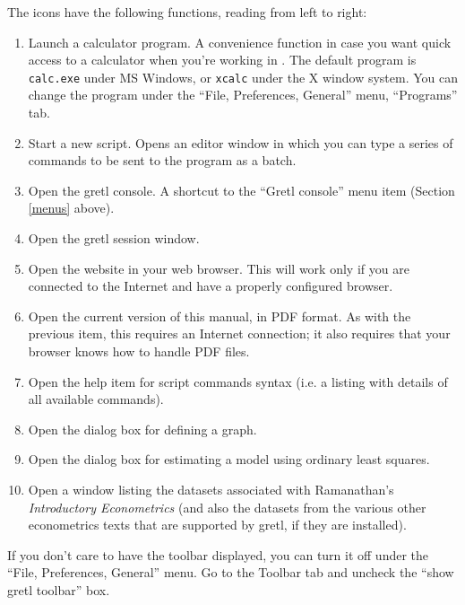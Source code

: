 The icons have the following functions, reading from left to
      right:

\begin{enumerate}
\item Launch a calculator program.  A convenience function in case you
  want quick access to a calculator when you're working in
  .  The default program is \verb+calc.exe+ under MS
  Windows, or \verb+xcalc+ under the X window system.  You can change
  the program under the ``File, Preferences, General'' menu,
  ``Programs'' tab.
\item Start a new script.  Opens an editor window in which you can
  type a series of commands to be sent to the program as a batch.
\item Open the gretl console.  A shortcut to the ``Gretl console''
  menu item (Section \ref{menus} above).
\item Open the gretl session window.
\item Open the  website in your web browser.  This will
  work only if you are connected to the Internet and have a properly
  configured browser.
\item Open the current version of this manual, in PDF format.  As with
  the previous item, this requires an Internet connection; it also
  requires that your browser knows how to handle PDF files.
\item Open the help item for script commands syntax (i.e. a listing
  with details of all available commands).
\item Open the dialog box for defining a graph.
\item Open the dialog box for estimating a model using ordinary least
  squares.
\item Open a window listing the datasets associated with Ramanathan's
  \emph{Introductory Econometrics} (and also the datasets from the
  various other econometrics texts that are supported by gretl, if
  they are installed).
\end{enumerate}


If you don't care to have the toolbar displayed, you can turn it
off under the ``File, Preferences, General'' menu. Go
      to the Toolbar tab and uncheck the ``show gretl
	toolbar'' box.


